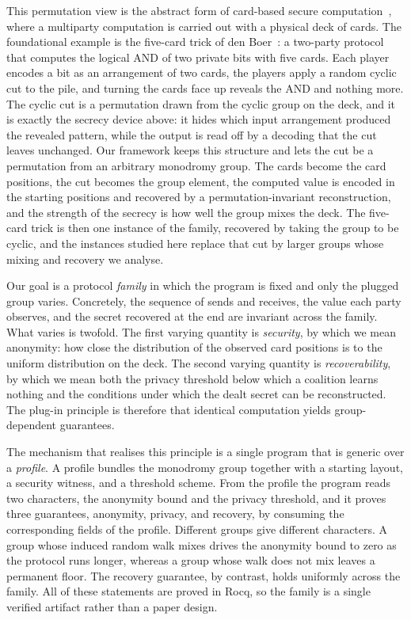 \documentclass[a4paper,11pt]{article}
\begin{document}
This permutation view is the abstract form of card-based secure
computation~\cite{koch2015,ruangwises2019}, where a multiparty computation is
carried out with a physical deck of cards. The foundational example is the
five-card trick of den Boer~\cite{denboer1989}: a two-party protocol that
computes the logical AND of two private bits with five cards. Each player encodes a bit as an arrangement of two cards, the players
apply a random cyclic cut to the pile, and turning the cards face up reveals the
AND and nothing more. The cyclic cut is a permutation drawn from the cyclic group
on the deck, and it is exactly the secrecy device above: it hides which input
arrangement produced the revealed pattern, while the output is read off by a
decoding that the cut leaves unchanged. Our framework keeps this structure and
lets the cut be a permutation from an arbitrary monodromy group. The cards become
the card positions, the cut becomes the group element, the computed value is
encoded in the starting positions and recovered by a permutation-invariant
reconstruction, and the strength of the secrecy is how well the group mixes the
deck. The five-card trick is then one instance of the family, recovered by taking
the group to be cyclic, and the instances studied here replace that cut by larger
groups whose mixing and recovery we analyse.

Our goal is a protocol \emph{family} in which the program is fixed and only the
plugged group varies. Concretely, the sequence of sends and receives, the value
each party observes, and the secret recovered at the end are invariant across
the family. What varies is twofold. The first varying quantity is
\emph{security}, by which we mean anonymity: how close the distribution of the
observed card positions is to the uniform distribution on the deck. The second varying
quantity is \emph{recoverability}, by which we mean both the privacy threshold
below which a coalition learns nothing and the conditions under which the dealt
secret can be reconstructed. The plug-in principle is therefore that identical
computation yields group-dependent guarantees.

The mechanism that realises this principle is a single program that is generic
over a \emph{profile}. A profile bundles the monodromy group together with a
starting layout, a security witness, and a threshold scheme. From the profile
the program reads two characters, the anonymity bound and the privacy threshold,
and it proves three guarantees, anonymity, privacy, and recovery, by consuming
the corresponding fields of the profile. Different groups give different
characters. A group whose induced random walk mixes drives the anonymity bound
to zero as the protocol runs longer, whereas a group whose walk does not mix
leaves a permanent floor. The recovery guarantee, by contrast, holds uniformly
across the family. All of these statements are proved in Rocq, so the family is
a single verified artifact rather than a paper design.
\end{document}
